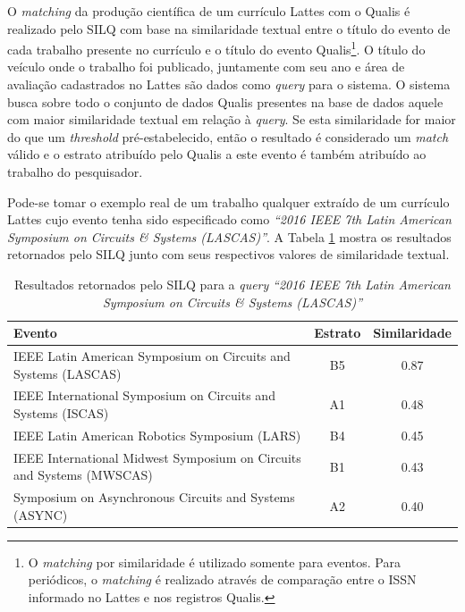 \documentclass[12pt]{article}
\newcommand{\quotes}[1]{``#1''}
\begin{document}
O \textit{matching} da produção científica de um currículo Lattes com o Qualis é realizado pelo SILQ com base na similaridade textual entre o título do evento de cada trabalho presente no currículo e o título do evento Qualis\footnote{O \textit{matching} por similaridade é utilizado somente para eventos. Para periódicos, o \textit{matching} é realizado através de comparação entre o ISSN informado no Lattes e nos registros Qualis.}. O título do veículo onde o trabalho foi publicado, juntamente com seu ano e área de avaliação cadastrados no Lattes são dados como \textit{query} para o sistema. O sistema busca sobre todo o conjunto de dados Qualis presentes na base de dados aquele com maior similaridade textual em relação à \textit{query}. Se esta similaridade for maior do que um \textit{threshold} pré-estabelecido, então o resultado é considerado um \textit{match} válido e o estrato atribuído pelo Qualis a este evento é também atribuído ao trabalho do pesquisador.

Pode-se tomar o exemplo real de um trabalho qualquer extraído de um currículo Lattes cujo evento tenha sido especificado como \textit{\quotes{2016 IEEE 7th Latin American Symposium on Circuits \& Systems (LASCAS)}}. A Tabela \ref{tab:exemplo-classificacao} mostra os resultados retornados pelo SILQ junto com seus respectivos valores de similaridade textual.

\begin{table}[!h]
\begin{center}
\caption{Resultados retornados pelo SILQ para a \textit{query} \textit{\quotes{2016 IEEE 7th Latin American Symposium on Circuits \& Systems (LASCAS)}}}\label{tab:exemplo-classificacao}
\begin{tabular}{ p{6cm} | c | c }
\hline
\textbf{Evento} & \textbf{Estrato} & \textbf{Similaridade} \\ \hline
IEEE Latin American Symposium on Circuits and Systems (LASCAS) & B5 & 0.87 \\ \hline
IEEE International Symposium on Circuits and Systems (ISCAS) & A1 & 0.48 \\ \hline
IEEE Latin American Robotics Symposium (LARS) & B4 & 0.45 \\ \hline
IEEE International Midwest Symposium on Circuits and Systems (MWSCAS) & B1 & 0.43 \\ \hline
Symposium on Asynchronous Circuits and Systems (ASYNC) & A2 & 0.40 \\ \hline
\end{tabular}
\end{center}
\end{table}
\end{document}
